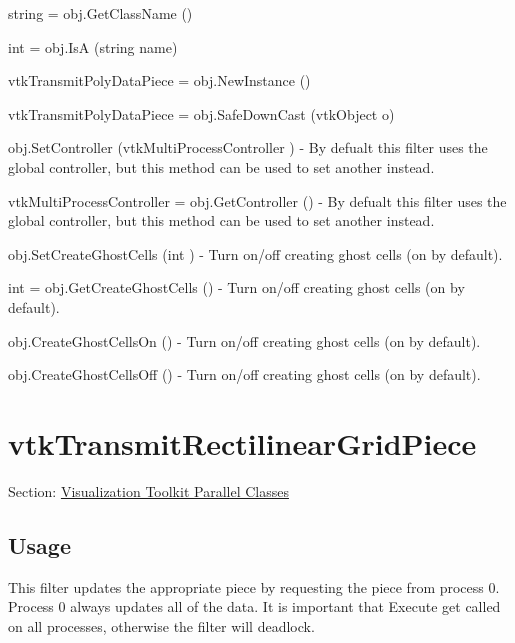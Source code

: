 \begin{DoxyItemize}
\item {\ttfamily string = obj.\-Get\-Class\-Name ()}  
\item {\ttfamily int = obj.\-Is\-A (string name)}  
\item {\ttfamily vtk\-Transmit\-Poly\-Data\-Piece = obj.\-New\-Instance ()}  
\item {\ttfamily vtk\-Transmit\-Poly\-Data\-Piece = obj.\-Safe\-Down\-Cast (vtk\-Object o)}  
\item {\ttfamily obj.\-Set\-Controller (vtk\-Multi\-Process\-Controller )} -\/ By defualt this filter uses the global controller, but this method can be used to set another instead.  
\item {\ttfamily vtk\-Multi\-Process\-Controller = obj.\-Get\-Controller ()} -\/ By defualt this filter uses the global controller, but this method can be used to set another instead.  
\item {\ttfamily obj.\-Set\-Create\-Ghost\-Cells (int )} -\/ Turn on/off creating ghost cells (on by default).  
\item {\ttfamily int = obj.\-Get\-Create\-Ghost\-Cells ()} -\/ Turn on/off creating ghost cells (on by default).  
\item {\ttfamily obj.\-Create\-Ghost\-Cells\-On ()} -\/ Turn on/off creating ghost cells (on by default).  
\item {\ttfamily obj.\-Create\-Ghost\-Cells\-Off ()} -\/ Turn on/off creating ghost cells (on by default).  
\end{DoxyItemize}\hypertarget{vtkparallel_vtktransmitrectilineargridpiece}{}\section{vtk\-Transmit\-Rectilinear\-Grid\-Piece}\label{vtkparallel_vtktransmitrectilineargridpiece}
Section\-: \hyperlink{sec_vtkparallel}{Visualization Toolkit Parallel Classes} \hypertarget{vtkwidgets_vtkxyplotwidget_Usage}{}\subsection{Usage}\label{vtkwidgets_vtkxyplotwidget_Usage}
This filter updates the appropriate piece by requesting the piece from process 0. Process 0 always updates all of the data. It is important that Execute get called on all processes, otherwise the filter will deadlock.


